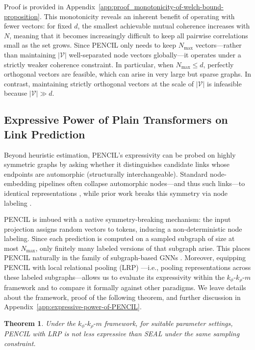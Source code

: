 \documentclass{article}
\theoremstyle{plain}
\newtheorem{theorem}{Theorem}[section]
\theoremstyle{definition}
\theoremstyle{remark}
\begin{document}
Proof is provided in Appendix~\ref{app:proof_monotonicity-of-welch-bound-proposition}. This monotonicity reveals an inherent benefit of operating with fewer vectors: for fixed \(d\), the smallest achievable mutual coherence increases with \(N\), meaning that it becomes increasingly difficult to keep all pairwise correlations small as the set grows. Since PENCIL only needs to keep \(N_{\max}\) vectors---rather than maintaining \(|\mathcal V|\) well-separated node vectors globally---it operates under a strictly weaker coherence constraint. In particular, when \(N_{\max} \le d\), perfectly orthogonal vectors are feasible, which can arise in very large but sparse graphs. In contrast, maintaining strictly orthogonal vectors at the scale of \(|\mathcal V|\) is infeasible because \(|\mathcal V| \gg d\).
    

\subsection{Expressive Power of Plain Transformers on Link Prediction}

Beyond heuristic estimation, PENCIL's expressivity can be probed on highly symmetric graphs by asking whether it distinguishes candidate links whose endpoints are automorphic (structurally interchangeable). Standard node-embedding pipelines often collapse automorphic nodes---and thus such links---to identical representations \cite{chamberlain2023graph}, while prior work breaks this symmetry via node labeling \cite{zhang_link_2018, zhang_labeling_2022}.

PENCIL is imbued with a native symmetry-breaking mechanism: the input projection assigns random vectors to tokens, inducing a non-deterministic node labeling. Since each prediction is computed on a sampled subgraph of size at most \(N_{\max}\), only finitely many labeled versions of that subgraph arise. This places PENCIL naturally in the family of subgraph-based GNNs \cite{murphy_relational_2019, chen_can_2020,zhou_relational_2023}. Moreover, equipping PENCIL with local relational pooling (LRP) \cite{chen_can_2020}---i.e., pooling representations across these labeled subgraphs---allows us to evaluate its expressivity within the \(k_\phi\text{-}k_\rho\text{-}m\) framework \cite{lachi2025bridgingtheorypracticelink} and to compare it formally against other paradigms. We leave details about the framework, proof of the following theorem, and further discussion in Appendix~\ref{app:expressive-power-of-PENCIL}.

\begin{theorem} \label{thm:expressivity-of-PENCIL}
    Under the \(k_\phi\text{-}k_\rho\text{-}m\) framework, for suitable parameter settings, PENCIL with LRP is not less expressive than SEAL under the same sampling constraint.
\end{theorem}
\end{document}
